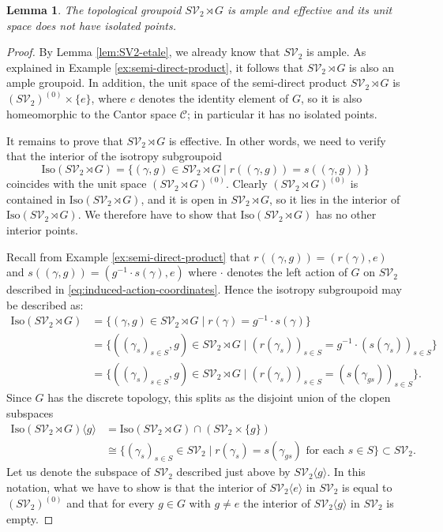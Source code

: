 \documentclass[10pt,a4paper]{amsart}
\numberwithin{equation}{section}
\numberwithin{figure}{section}
\newtheorem{lem}[thm]{Lemma}
\theoremstyle{definition}
\newcommand{\cC}{\mathcal{C}}
\newcommand{\cV}{\mathcal{V}}
\begin{document}
\begin{lem}
\label{lem:svg-ample-eff}
The topological groupoid $S\mathcal{V}_2 \rtimes {G}$ is ample and effective and its unit space does not have isolated points.
\end{lem}
\begin{proof}
By Lemma \ref{lem:SV2-etale}, we already know that $S\cV_2$ is ample. As explained in Example \ref{ex:semi-direct-product}, it follows that $S\cV_2 \rtimes G$ is also an ample groupoid. In addition, the unit space of the semi-direct product $S\cV_2 \rtimes G$ is $(S\cV_2)^{(0)} \times \{e\}$, where $e$ denotes the identity element of $G$, so it is also homeomorphic to the Cantor space $\cC$; in particular it has no isolated points.

It remains to prove that $S\cV_2 \rtimes G$ is effective. In other words, we need to verify that the interior of the isotropy subgroupoid
\[
\mathrm{Iso}(S\cV_2 \rtimes G) = \{ (\gamma,g) \in S\mathcal{V}_2\rtimes {G} \mid r((\gamma,g)) = s((\gamma,g)) \}
\]
coincides with the unit space $(S\mathcal{V}_2\rtimes {G})^{(0)}$. Clearly $(S\mathcal{V}_2\rtimes {G})^{(0)}$ is contained in $\mathrm{Iso}(S\cV_2 \rtimes G)$, and it is open in $S\cV_2 \rtimes G$, so it lies in the interior of $\mathrm{Iso}(S\cV_2 \rtimes G)$. We therefore have to show that $\mathrm{Iso}(S\cV_2 \rtimes G)$ has no other interior points.

Recall from Example \ref{ex:semi-direct-product} that $r((\gamma,g)) = (r(\gamma),e)$ and $s((\gamma,g)) = (g^{-1} \cdot s(\gamma),e)$ where $\cdot$ denotes the left action of $G$ on $S\cV_2$ described in \eqref{eq:induced-action-coordinates}. Hence the isotropy subgroupoid may be described as:
\begin{align*}
\mathrm{Iso}(S\cV_2 \rtimes G) &= \{ (\gamma,g) \in S\cV_2 \rtimes G \mid r(\gamma) = g^{-1} \cdot s(\gamma) \} \\
&= \{ ((\gamma_s)_{s \in S},g) \in S\cV_2 \rtimes G \mid (r(\gamma_s))_{s \in S} = g^{-1} \cdot (s(\gamma_s))_{s \in S} \} \\
&= \{ ((\gamma_s)_{s \in S},g) \in S\cV_2 \rtimes G \mid (r(\gamma_s))_{s \in S} = (s(\gamma_{gs}))_{s \in S} \} .
\end{align*}
Since $G$ has the discrete topology, this splits as the disjoint union of the clopen subspaces
\begin{align*}
\mathrm{Iso}(S\cV_2 \rtimes G) \langle g \rangle &= \mathrm{Iso}(S\cV_2 \rtimes G) \cap (S\cV_2 \times \{ g \}) \\
&\cong \{ (\gamma_s)_{s \in S} \in S\cV_2 \mid r(\gamma_s) = s(\gamma_{gs}) \text{ for each } s \in S \} \subset S\cV_2 .
\end{align*}
Let us denote the subspace of $S\cV_2$ described just above by $S\cV_2\langle g \rangle$. In this notation, what we have to show is that the interior of $S\cV_2 \langle e \rangle$ in $S\cV_2$ is equal to $(S\cV_2)^{(0)}$ and that for every $g \in G$ with $g \neq e$ the interior of $S\cV_2 \langle g \rangle$ in $S\cV_2$ is empty.


\end{proof}
\end{document}
